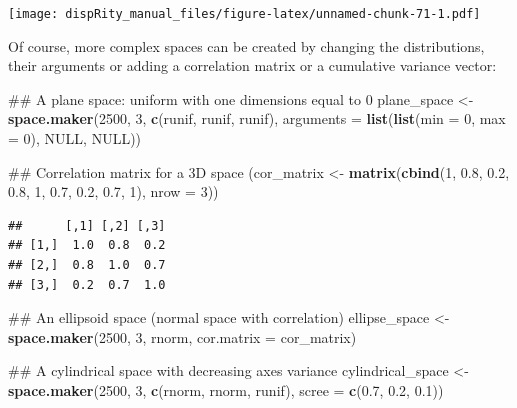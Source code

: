 \documentclass[]{book}
\newenvironment{Shaded}{\begin{snugshade}}{\end{snugshade}}
\newcommand{\KeywordTok}[1]{\textcolor[rgb]{0.13,0.29,0.53}{\textbf{#1}}}
\newcommand{\DataTypeTok}[1]{\textcolor[rgb]{0.13,0.29,0.53}{#1}}
\newcommand{\DecValTok}[1]{\textcolor[rgb]{0.00,0.00,0.81}{#1}}
\newcommand{\FloatTok}[1]{\textcolor[rgb]{0.00,0.00,0.81}{#1}}
\newcommand{\StringTok}[1]{\textcolor[rgb]{0.31,0.60,0.02}{#1}}
\newcommand{\OtherTok}[1]{\textcolor[rgb]{0.56,0.35,0.01}{#1}}
\newcommand{\NormalTok}[1]{#1}
\theoremstyle{definition}
\theoremstyle{definition}
\theoremstyle{remark}
\begin{document}
\texttt{[image: dispRity\_manual\_files/figure-latex/unnamed-chunk-71-1.pdf]}

Of course, more complex spaces can be created by changing the
distributions, their arguments or adding a correlation matrix or a
cumulative variance vector:

\begin{Shaded}
\begin{Highlighting}[]
\NormalTok{## A plane space: uniform with one dimensions equal to 0}
\NormalTok{plane_space <-}\StringTok{ }\KeywordTok{space.maker}\NormalTok{(}\DecValTok{2500}\NormalTok{, }\DecValTok{3}\NormalTok{, }\KeywordTok{c}\NormalTok{(runif, runif, runif),}
                           \DataTypeTok{arguments =} \KeywordTok{list}\NormalTok{(}\KeywordTok{list}\NormalTok{(}\DataTypeTok{min =} \DecValTok{0}\NormalTok{, }\DataTypeTok{max =} \DecValTok{0}\NormalTok{), }\OtherTok{NULL}\NormalTok{, }\OtherTok{NULL}\NormalTok{))}

\NormalTok{## Correlation matrix for a 3D space}
\NormalTok{(cor_matrix <-}\StringTok{ }\KeywordTok{matrix}\NormalTok{(}\KeywordTok{cbind}\NormalTok{(}\DecValTok{1}\NormalTok{, }\FloatTok{0.8}\NormalTok{, }\FloatTok{0.2}\NormalTok{, }\FloatTok{0.8}\NormalTok{, }\DecValTok{1}\NormalTok{, }\FloatTok{0.7}\NormalTok{, }\FloatTok{0.2}\NormalTok{, }\FloatTok{0.7}\NormalTok{, }\DecValTok{1}\NormalTok{), }\DataTypeTok{nrow =} \DecValTok{3}\NormalTok{))}
\end{Highlighting}
\end{Shaded}

\begin{verbatim}
##      [,1] [,2] [,3]
## [1,]  1.0  0.8  0.2
## [2,]  0.8  1.0  0.7
## [3,]  0.2  0.7  1.0
\end{verbatim}

\begin{Shaded}
\begin{Highlighting}[]
\NormalTok{## An ellipsoid space (normal space with correlation)}
\NormalTok{ellipse_space <-}\StringTok{ }\KeywordTok{space.maker}\NormalTok{(}\DecValTok{2500}\NormalTok{, }\DecValTok{3}\NormalTok{, rnorm, }\DataTypeTok{cor.matrix =}\NormalTok{ cor_matrix)}

\NormalTok{## A cylindrical space with decreasing axes variance}
\NormalTok{cylindrical_space <-}\StringTok{ }\KeywordTok{space.maker}\NormalTok{(}\DecValTok{2500}\NormalTok{, }\DecValTok{3}\NormalTok{, }\KeywordTok{c}\NormalTok{(rnorm, rnorm, runif),}
                                 \DataTypeTok{scree =} \KeywordTok{c}\NormalTok{(}\FloatTok{0.7}\NormalTok{, }\FloatTok{0.2}\NormalTok{, }\FloatTok{0.1}\NormalTok{))}
\end{Highlighting}
\end{Shaded}
\end{document}
